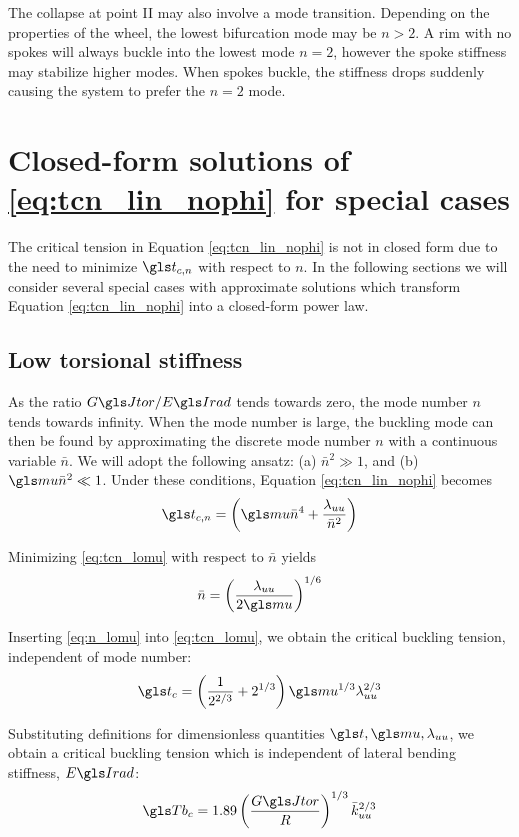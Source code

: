 \documentclass[\rootdir/thesis.tex]{subfiles}
\begin{document}
The collapse at point II may also involve a mode transition. Depending on the properties of the wheel, the lowest bifurcation mode may be $n>2$. A rim with no spokes will always buckle into the lowest mode $n=2$, however the spoke stiffness may stabilize higher modes. When spokes buckle, the stiffness drops suddenly causing the system to prefer the $n=2$ mode.


\section{Closed-form solutions of \eqref{eq:tcn_lin_nophi} for special cases}

The critical tension in Equation \ref{eq:tcn_lin_nophi} is not in closed form due to the need to minimize $\ts_{c,n}$ with respect to $n$. In the following sections we will consider several special cases with approximate solutions which transform Equation \eqref{eq:tcn_lin_nophi} into a closed-form power law.

\subsection{Low torsional stiffness}
As the ratio $\GJ/\EIr$ tends towards zero, the mode number $n$ tends towards infinity. When the mode number is large, the buckling mode can then be found by approximating the discrete mode number $n$ with a continuous variable $\bar{n}$. We will adopt the following ansatz: (a) $\bar{n}^2 \gg 1$, and (b) $\m\bar{n}^2 \ll 1$. Under these conditions, Equation \eqref{eq:tcn_lin_nophi} becomes
\begin{equation}
\label{eq:tcn_lomu}
\ts_{c,n} = \left(\m \bar{n}^4 + \frac{\lr_{uu}}{\bar{n}^2}\right)
\end{equation}

Minimizing \eqref{eq:tcn_lomu} with respect to $\bar{n}$ yields
\begin{equation}
\label{eq:n_lomu}
\bar{n}=\left(\frac{\lr_{uu}}{2\m}\right)^{1/6}
\end{equation}

Inserting \eqref{eq:n_lomu} into \eqref{eq:tcn_lomu}, we obtain the critical buckling tension, independent of mode number:
\begin{equation}
\label{eq:tc_lomu}
\ts_c = \left(\frac{1}{2^{2/3}} + 2^{1/3}\right)\m^{1/3}\lr_{uu}^{2/3}
\end{equation}

Substituting definitions for dimensionless quantities $\ts,\m,\lr_{uu}$, we obtain a critical buckling tension which is independent of lateral bending stiffness, $\EIr$:
\begin{equation}
\label{eq:Tc_lo_mu}
\Tb_c = 1.89 \left( \frac{\GJ}{R} \right)^{1/3} \kuu^{2/3}
\end{equation}
\end{document}
